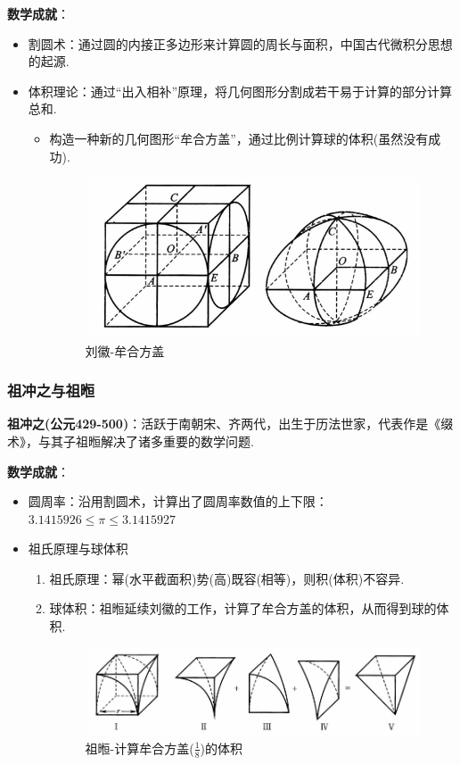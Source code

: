 \documentclass{Math_Note}
\begin{document}
\textbf{数学成就}：
\begin{itemize}
    \item 割圆术：通过圆的内接正多边形来计算圆的周长与面积，中国古代微积分思想的起源.
    \item 体积理论：通过“出入相补”原理，将几何图形分割成若干易于计算的部分计算总和.
    \begin{itemize}
        \item 构造一种新的几何图形“牟合方盖”，通过比例计算球的体积(虽然没有成功).
        \begin{figure}[H]
            \centering
            \includegraphics[scale=0.8]{"./Figures/LiHui_con_geo.png"}
            \caption{刘徽-牟合方盖}
        \end{figure}
    \end{itemize}
\end{itemize}

\subsubsection{祖冲之与祖暅}
\textbf{祖冲之(公元429-500)}：活跃于南朝宋、齐两代，出生于历法世家，代表作是《缀术》，与其子祖暅解决了诸多重要的数学问题.

\textbf{数学成就}：
\begin{itemize}
    \item 圆周率：沿用割圆术，计算出了圆周率数值的上下限：$3.1415926 \leq \pi \leq 3.1415927$
    \item 祖氏原理与球体积
    \begin{enumerate}
        \item 祖氏原理：幂(水平截面积)势(高)既容(相等)，则积(体积)不容异.
        \item 球体积：祖暅延续刘徽的工作，计算了牟合方盖的体积，从而得到球的体积.
        \begin{figure}[H]
            \centering
            \includegraphics[scale=0.8]{"./Figures/LiuHui_con_geo_cal.png"}
            \caption{祖暅-计算牟合方盖($\frac{1}{8}$)的体积}
        \end{figure}
    \end{enumerate}
\end{itemize}
\end{document}
